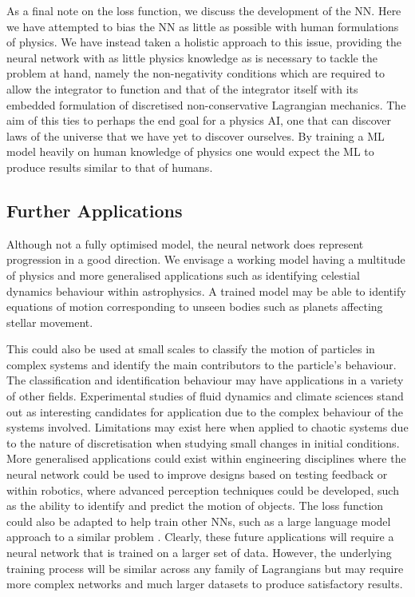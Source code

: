 \documentclass[10pt]{iopart}
\begin{document}
As a final note on the loss function, we discuss the development of the NN. Here we have attempted to bias the NN as little as possible with human formulations of physics. We have instead taken a holistic approach to this issue, providing the neural network with as little physics knowledge as is necessary to tackle the problem at hand, namely the non-negativity conditions which are required to allow the integrator to function and that of the integrator itself with its embedded formulation of discretised non-conservative Lagrangian mechanics. The aim of this ties to perhaps the end goal for a physics AI, one that can discover laws of the universe that we have yet to discover ourselves. By training a ML model heavily on human knowledge of physics one would expect the ML to produce results similar to that of humans. 

\subsection{Further Applications}
Although not a fully optimised model, the neural network does represent progression in a good direction. We envisage a working model having a multitude of physics and more generalised applications such as identifying celestial dynamics  behaviour within astrophysics. A trained model may be able to identify equations of motion corresponding to unseen bodies such as planets affecting stellar movement.

 This could also be used at small scales to classify the motion of particles in complex systems and identify the main contributors to the particle's behaviour. The classification and identification behaviour may have applications in a variety of other fields. Experimental studies of fluid dynamics and climate sciences stand out as interesting candidates for application due to the complex behaviour of the systems involved. Limitations may exist here when applied to chaotic systems due to the nature of discretisation when studying small changes in initial conditions.
More generalised applications could exist within engineering disciplines where the neural network could be used to improve designs based on testing feedback or within robotics, where advanced perception techniques could be developed, such as the ability to identify and predict the motion of objects.
The loss function could also be adapted to help train other NNs, such as a large language model approach to a similar problem \cite{PhySo}.
Clearly, these future applications will require a neural network that is trained on a larger set of data. However, the underlying training process will be similar across any family of Lagrangians but may require more complex networks and much larger datasets to produce satisfactory results.
\end{document}
